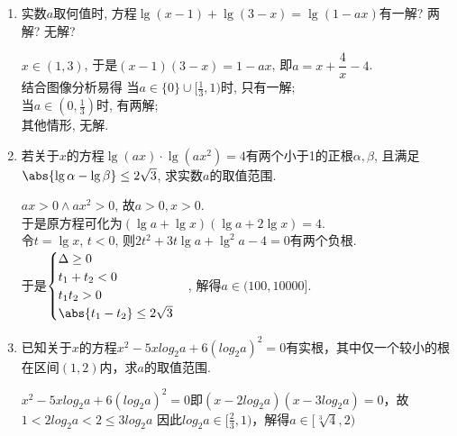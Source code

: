 \begin{enumerate}
    \item 实数$a$取何值时, 方程$\lg(x-1)+\lg(3-x)=\lg(1-ax)$有一解? 两解? 无解? 
    \begin{jieda}
    $x\in(1,3)$, 于是$(x-1)(3-x)=1-ax$, 即$a=x+\dfrac{4}{x}-4$. \\
    结合图像分析易得
    当$a\in\{0\}\cup[\frac{1}{3},1)$时, 只有一解; \\
    当$a\in(0,\frac{1}{3})$时, 有两解; \\
    其他情形, 无解. 
    \end{jieda}
    \begin{vspace_}
        \vsp[3]
    \end{vspace_}

    \item 若关于$x$的方程$\lg(ax)\cdot\lg(ax^2)=4$有两个小于1的正根$\alpha,\beta$, 
    且满足$\abs{\lg\alpha-\lg\beta}\leq 2\sqrt{3}$, 求实数$a$的取值范围. 
    \begin{jieda}
    $ax>0\land ax^2>0$, 故$a>0,x>0$. \\
    于是原方程可化为$(\lg{a}+\lg{x})(\lg{a}+2\lg{x})=4$. \\
    令$t=\lg{x}$, $t<0$, 则$2t^2+3t\lg{a}+\lg^2a-4=0$有两个负根.\\
    于是$\begin{cases}
    \Delta\geq 0\\
    t_1+t_2<0\\
    t_1t_2>0\\
    \abs{t_1-t_2}\leq 2\sqrt{3}
    \end{cases}$, 
    解得$a\in(100,10000]$. 
    \end{jieda}
    \begin{vspace_}
        \vsp[3]
    \end{vspace_}

    \item 已知关于$x$的方程$x^2-5xlog_2a+6(log_2a)^2 = 0$有实根，其中仅一个较小的根在区间$(1, 2)$内，求$a$的取值范围.
    \begin{jieda}
        $x^2-5xlog_2a+6(log_2a)^2 = 0$即$(x - 2log_2a)(x - 3log_2a) = 0$，故$1 < 2log_2a < 2 \leq 3log_2a$
        因此$log_2a \in [\frac{2}{3}, 1)$，解得$a \in [\sqrt[3]{4}, 2)$
    \end{jieda}
    \begin{vspace_}
        \vsp[3]
    \end{vspace_}


\end{enumerate}
